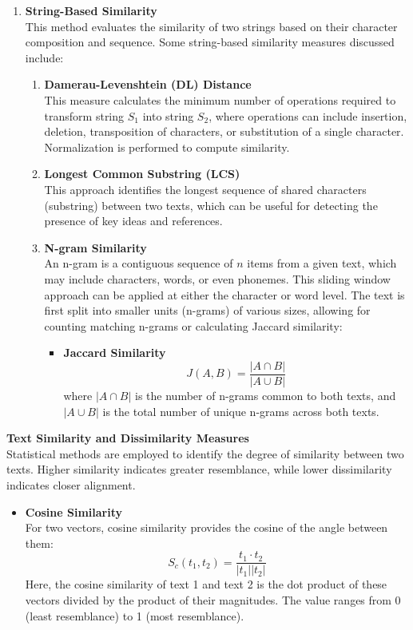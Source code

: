 \documentclass{article}
\begin{document}
\begin{enumerate}
		\item \textbf{String-Based Similarity} \\
		This method evaluates the similarity of two strings based on their character composition and sequence. Some string-based similarity measures discussed include:
		\begin{enumerate}
			\item \textbf{Damerau-Levenshtein (DL) Distance} \\
			This measure calculates the minimum number of operations required to transform string \( S_1 \) into string \( S_2 \), where operations can include insertion, deletion, transposition of characters, or substitution of a single character. Normalization \cite{1_gomaa2014arabic} is performed to compute similarity.
			
			\item \textbf{Longest Common Substring (LCS)} \\
			This approach identifies the longest sequence of shared characters (substring) between two texts, which can be useful for detecting the presence of key ideas and references.
			
			\item \textbf{N-gram Similarity} \\
			An n-gram is a contiguous sequence of \( n \) items from a given text, which may include characters, words, or even phonemes. This sliding window approach can be applied at either the character or word level. The text is first split into smaller units (n-grams) of various sizes, allowing for counting matching n-grams or calculating Jaccard similarity:
			\begin{itemize}
				\item \textbf{Jaccard Similarity} \\
				$$J(A,B) = \frac{|A \cap B|}{|A \cup B|}$$
				where \( |A \cap B| \) is the number of n-grams common to both texts, and \( |A \cup B| \) is the total number of unique n-grams across both texts.
			\end{itemize}
		\end{enumerate}
	\end{enumerate}
	
	\textbf{Text Similarity and Dissimilarity Measures} \\
	Statistical methods are employed to identify the degree of similarity between two texts. Higher similarity indicates greater resemblance, while lower dissimilarity indicates closer alignment.
	\begin{itemize}
		\item \textbf{Cosine Similarity} \\
		For two vectors, cosine similarity provides the cosine of the angle between them:
		$$S_c(t_1, t_2) = \frac{t_1 \cdot t_2}{|t_1||t_2|}$$
		Here, the cosine similarity of text 1 and text 2 is the dot product of these vectors divided by the product of their magnitudes. The value ranges from 0 (least resemblance) to 1 (most resemblance).
	\end{itemize}
	
\end{document}
